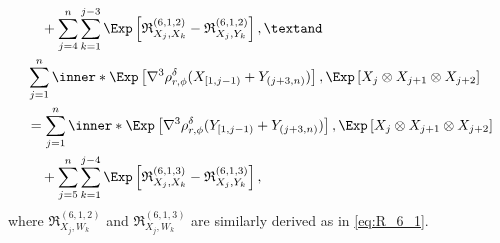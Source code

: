 \documentclass[aos]{imsart}
\begin{document}
\begin{appendix}
\begin{equation*}
\begin{aligned}
    & \quad + \sum_{j=4}^{n} \sum_{k=1}^{j-3} \Exp \left[ 
        \mathfrak{R}_{X_j,X_k}^{(6,1,2)}
        - \mathfrak{R}_{X_j,Y_k}^{(6,1,2)}
    \right], \textand 
    \\
    & \sum_{j=1}^n \inner*{ 
        \Exp\left[ \nabla^3 \rho_{r,\phi}^\delta(X_{[1,j-1)} + Y_{(j+3,n)}) \right], 
        \Exp\left[ X_{j} \otimes X_{j+1} \otimes X_{j+2} \right]} \\
    & = \sum_{j=1}^n \inner*{ 
        \Exp\left[ \nabla^3 \rho_{r,\phi}^\delta(Y_{[1,j-1)} + Y_{(j+3,n)}) \right], 
        \Exp\left[ X_{j} \otimes X_{j+1} \otimes X_{j+2} \right]} \\
    & \quad + \sum_{j=5}^{n} \sum_{k=1}^{j-4} \Exp \left[ 
        \mathfrak{R}_{X_j,X_k}^{(6,1,3)}
        - \mathfrak{R}_{X_j,Y_k}^{(6,1,3)}
    \right],
\end{aligned}
\end{equation*}
where $\mathfrak{R}_{X_j,W_k}^{(6,1,2)}$ and $\mathfrak{R}_{X_j,W_k}^{(6,1,3)}$ are similarly derived as in \cref{eq:R_6_1}.

\end{appendix}
\end{document}
